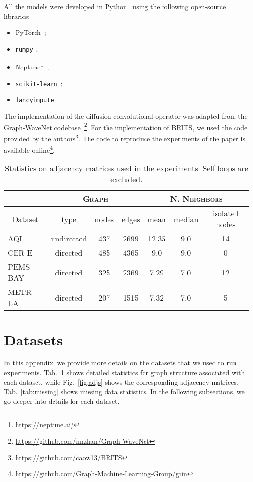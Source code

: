 \documentclass{article} \usepackage{iclr2022_conference,times}
\begin{document}
All the models were developed in Python~\citep{rossum2009python} using the following open-source libraries:
\begin{itemize}
    \item PyTorch~\citep{paszke2019pytorch};
    \item \texttt{numpy}~\citep{harris2020array};
\item Neptune\footnote{\url{https://neptune.ai/}}~\citep{neptune2021neptune};
    \item \texttt{scikit-learn}~\citep{pedregosa2011scikit};
    \item \texttt{fancyimpute}~\citep{fancyimpute}.
\end{itemize}
The implementation of the diffusion convolutional operator was adapted from the Graph-WaveNet codebase~\footnote{\url{https://github.com/nnzhan/Graph-WaveNet}}. For the implementation of BRITS, we used the code provided by the authors\footnote{\url{https://github.com/caow13/BRITS}}. The code to reproduce the experiments of the paper is available online\footnote{\url{https://github.com/Graph-Machine-Learning-Group/grin}}.

\begin{table}[ht]
\caption{Statistics on adjacency matrices used in the experiments. Self loops are excluded.}
\vspace{0.1cm}
\centering
\begin{tabular}{ l | c c c | c c c}
\toprule
 \multicolumn{1}{c}{}&\multicolumn{3}{c}{\textsc{Graph}} & \multicolumn{3}{c}{\textsc{N. Neighbors}} \\
\midrule
\multicolumn{1}{c|}{Dataset} & type & nodes & edges & mean & median & isolated nodes\\
\midrule
AQI & undirected & 437 & 2699 & 12.35 & 9.0 & 14 \\
CER-E & directed & 485 & 4365 & 9.0 & 9.0 & 0 \\
PEMS-BAY & directed & 325 & 2369 & 7.29 & 7.0 & 12 \\
METR-LA & directed & 207 & 1515 & 7.32 & 7.0 & 5\\
\bottomrule
\end{tabular}
\label{t:adj}
\end{table} 
\section{Datasets}

In this appendix, we provide more details on the datasets that we used to run experiments. Tab.~\ref{t:adj} shows detailed statistics for graph structure associated with each dataset, while Fig.~\ref{fig:adjs} shows the corresponding adjacency matrices. Tab.~\ref{tab:missing} shows missing data statistics. In the following subsections, we go deeper into details for each dataset.
\end{document}
